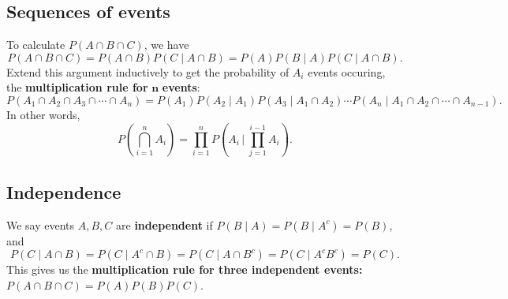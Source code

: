 \subsection{Sequences of events}
To calculate $P(A \cap B\cap C)$, we have \[
    P(A \cap B\cap C)= P(A \cap B)P(C \mid A \cap B)=P(A)P(B \mid A)P(C \mid A \cap B).
\] Extend this argument inductively to get the probability of $A_i $ events occuring, the \textbf{multiplication rule for} $\mathbf n$ \textbf{events}: \[
P(A_1 \cap  A_2 \cap A_3 \cap  \cdots \cap A_n )=P(A_1)P(A_2 \mid A_1)P(A_3\mid A_1 \cap A_2) \cdots P(A_n \mid A_1\cap A_2 \cap \cdots \cap A_{n-1}).
\]In other words,
\[
    P \left( \bigcap_{i=1} ^n A_i \right)= \prod _{i=1} ^n  P\left( A_i  \,\Big|\  \prod _{j=1}^{i-1}A_i   \right) .
\] 
\subsection{Independence}

We say events $A,B,C$ are \textbf{independent} if $P(B \mid A)=P(B \mid A ^c)=P(B)$, and \[
    P(C \mid A \cap B)= P(C \mid A^c \cap B) = P(C \mid A \cap B^c)=P(C \mid  A^c B^c)=P(C).
\] This gives us the \textbf{multiplication rule for three independent events:} $P(A \cap B \cap C)=P(A)P(B)P(C)$.
